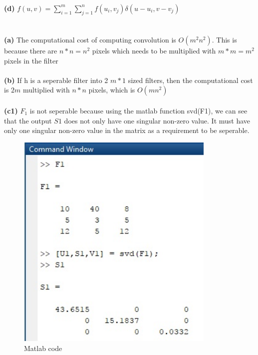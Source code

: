 \documentclass[]{article}
\begin{document}
\\\\\\\\\\
\textbf{(d)} $f(u,v) = \sum_{i=1}^{m} \sum_{j=1}^{n}
f(u_{i}, v_{j})\delta(u-u_{i}, v-v_{j})$
\section{}
\textbf{(a)} The computational cost of computing convolution is $O(m^{2}n^{2})$. This is because there are $n * n = n^{2}$ pixels which needs to be multiplied with $m * m = m^{2}$ pixels in the filter
\\
\\
\textbf{(b)} If h is a seperable filter into 2 $m * 1 $ sized filters, then the computational cost is $2m$ multiplied with $n * n$ pixels, which is $O(mn^{2})$
\\
\\
\textbf{(c1)} $F_{1}$ is not seperable because using the matlab function svd(F1), we can see that the output $S1$ does not only have one singular non-zero value. It must have only one singular non-zero value in the matrix as a requirement to be seperable.
 \begin{figure}[h!]
 \centering
  \includegraphics[width=0.85\textwidth]{img/svdF1.jpg}
 \caption{Matlab code}
 \end{figure}
\end{document}
